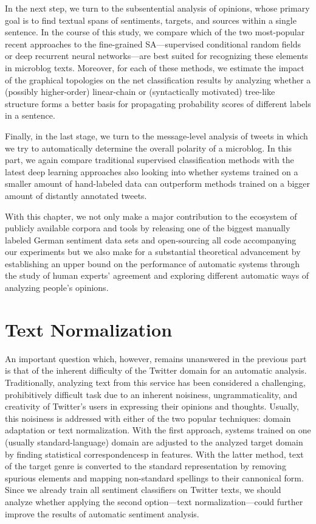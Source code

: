 \documentclass{article}
\begin{document}
In the next step, we turn to the subsentential analysis of opinions,
whose primary goal is to find textual spans of sentiments, targets,
and sources within a single sentence.  In the course of this study, we
compare which of the two most-popular recent approaches to the
fine-grained SA---supervised conditional random fields or deep
recurrent neural networks---are best suited for recognizing these
elements in microblog texts.  Moreover, for each of these methods, we
estimate the impact of the graphical topologies on the net
classification results by analyzing whether a (possibly higher-order)
linear-chain or (syntactically motivated) tree-like structure forms a
better basis for propagating probability scores of different labels in
a sentence.

Finally, in the last stage, we turn to the message-level analysis of
tweets in which we try to automatically determine the overall polarity
of a microblog.  In this part, we again compare traditional supervised
classification methods with the latest deep learning approaches also
looking into whether systems trained on a smaller amount of
hand-labeled data can outperform methods trained on a bigger amount of
distantly annotated tweets.

With this chapter, we not only make a major contribution to the
ecosystem of publicly available corpora and tools by releasing one of
the biggest manually labeled German sentiment data sets and
open-sourcing all code accompanying our experiments but we also make
for a substantial theoretical advancement by establishing an upper
bound on the performance of automatic systems through the study of
human experts' agreement and exploring different automatic ways of
analyzing people's opinions.

\section*{Text Normalization}
An important question which, however, remains unanswered in the
previous part is that of the inherent difficulty of the Twitter domain
for an automatic analysis.  Traditionally, analyzing text from this
service has been considered a challenging, prohibitively difficult
task due to an inherent noisiness, ungrammaticality, and creativity of
Twitter's users in expressing their opinions and thoughts.  Usually,
this noisiness is addressed with either of the two popular techniques:
domain adaptation or text normalization.  With the first approach,
systems trained on one (usually standard-language) domain are adjusted
to the analyzed target domain by finding statistical correspondencesp
in features.  With the latter method, text of the target genre is
converted to the standard representation by removing spurious elements
and mapping non-standard spellings to their cannonical form.  Since we
already train all sentiment classifiers on Twitter texts, we should
analyze whether applying the second option---text
normalization---could further improve the results of automatic
sentiment analysis.
\end{document}
